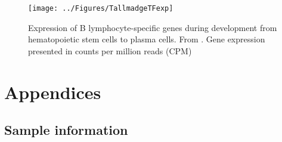 \documentclass[12pt]{article}
\begin{document}
			\begin{figure}
				\centering
				\texttt{[image: ../Figures/TallmadgeTFexp]}
				\caption{Expression of B lymphocyte-specific genes during development from hematopoietic stem cells to plasma cells. From \citet{Tallmadge15}. Gene expression presented in counts per million reads (CPM)}
				\label{fig:TallTFexp}
			\end{figure}
			
			
					\appendix
					\section{Appendices}
					
					\subsection{Sample information}
					
					
					
					
					
\end{document}
